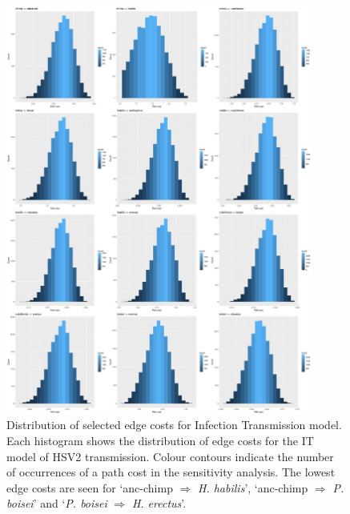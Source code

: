 \documentclass[fleqn,10pt]{wlscirep}
\begin{document}
\begin{figure}
  \centering
  \includegraphics[width=0.9\textwidth]{figs/gamma_individual_path_costs}
  \caption{ Distribution of selected edge costs for Infection Transmission model. 
Each histogram shows the distribution of edge costs for the IT model of HSV2 transmission. Colour contours indicate the number of occurrences of a path cost in the sensitivity analysis. The lowest edge costs are seen for ‘anc-chimp $\Rightarrow$ \textit{H. habilis}’, ‘anc-chimp $\Rightarrow$ \textit{P. boisei}’ and ‘\textit{P. boisei} $\Rightarrow$ \textit{H. erectus}’.}
  \label{fig:gamma-paths}   
\end{figure}     
\end{document}
